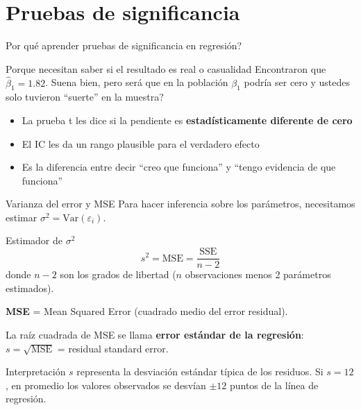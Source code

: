 \documentclass[aspectratio=169, 11pt]{beamer}
\begin{document}
\section{Pruebas de significancia}

\begin{frame}{\textquestiondown{}Por qu\'e aprender pruebas de significancia en regresi\'on?}
\begin{exampleblock}{Porque necesitan saber si el resultado es real o casualidad}
\small
Encontraron que $\hat{\beta}_1 = 1.82$. Suena bien, pero \textquestiondown{}ser\'a que en la poblaci\'on $\beta_1$ podr\'ia ser cero y ustedes solo tuvieron ``suerte'' en la muestra?
\begin{itemize}\setlength{\itemsep}{2pt}
  \item La prueba t les dice si la pendiente es \textbf{estad\'isticamente diferente de cero}
  \item El IC les da un rango plausible para el verdadero efecto
  \item Es la diferencia entre decir ``creo que funciona'' y ``tengo evidencia de que funciona''
\end{itemize}
\end{exampleblock}
\end{frame}

\begin{frame}{Varianza del error y MSE}
Para hacer inferencia sobre los parámetros, necesitamos estimar $\sigma^2 = \text{Var}(\varepsilon_i)$.

\begin{block}{Estimador de $\sigma^2$}
\[
s^2 = \text{MSE} = \frac{\text{SSE}}{n - 2}
\]
donde $n - 2$ son los grados de libertad ($n$ observaciones menos 2 par\'ametros estimados).
\end{block}

\vspace{0.1cm}
\textbf{MSE} = Mean Squared Error (cuadrado medio del error residual).

\vspace{0.1cm}
La ra\'iz cuadrada de MSE se llama \textbf{error est\'andar de la regresi\'on}: $s = \sqrt{\text{MSE}}$ = residual standard error.

\vspace{0.1cm}
\begin{exampleblock}{Interpretaci\'on}
\small $s$ representa la desviaci\'on est\'andar t\'ipica de los residuos. Si $s = 12$, en promedio los valores observados se desv\'ian $\pm 12$ puntos de la l\'inea de regresi\'on.
\end{exampleblock}
\end{frame}
\end{document}
